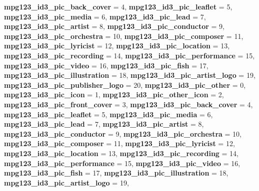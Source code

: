 \begin{DoxyCompactItemize}
\newline
{\bfseries mpg123\+\_\+id3\+\_\+pic\+\_\+back\+\_\+cover} = 4, 
{\bfseries mpg123\+\_\+id3\+\_\+pic\+\_\+leaflet} = 5, 
{\bfseries mpg123\+\_\+id3\+\_\+pic\+\_\+media} = 6, 
{\bfseries mpg123\+\_\+id3\+\_\+pic\+\_\+lead} = 7, 
\newline
{\bfseries mpg123\+\_\+id3\+\_\+pic\+\_\+artist} = 8, 
{\bfseries mpg123\+\_\+id3\+\_\+pic\+\_\+conductor} = 9, 
{\bfseries mpg123\+\_\+id3\+\_\+pic\+\_\+orchestra} = 10, 
{\bfseries mpg123\+\_\+id3\+\_\+pic\+\_\+composer} = 11, 
\newline
{\bfseries mpg123\+\_\+id3\+\_\+pic\+\_\+lyricist} = 12, 
{\bfseries mpg123\+\_\+id3\+\_\+pic\+\_\+location} = 13, 
{\bfseries mpg123\+\_\+id3\+\_\+pic\+\_\+recording} = 14, 
{\bfseries mpg123\+\_\+id3\+\_\+pic\+\_\+performance} = 15, 
\newline
{\bfseries mpg123\+\_\+id3\+\_\+pic\+\_\+video} = 16, 
{\bfseries mpg123\+\_\+id3\+\_\+pic\+\_\+fish} = 17, 
{\bfseries mpg123\+\_\+id3\+\_\+pic\+\_\+illustration} = 18, 
{\bfseries mpg123\+\_\+id3\+\_\+pic\+\_\+artist\+\_\+logo} = 19, 
\newline
{\bfseries mpg123\+\_\+id3\+\_\+pic\+\_\+publisher\+\_\+logo} = 20, 
{\bfseries mpg123\+\_\+id3\+\_\+pic\+\_\+other} = 0, 
{\bfseries mpg123\+\_\+id3\+\_\+pic\+\_\+icon} = 1, 
{\bfseries mpg123\+\_\+id3\+\_\+pic\+\_\+other\+\_\+icon} = 2, 
\newline
{\bfseries mpg123\+\_\+id3\+\_\+pic\+\_\+front\+\_\+cover} = 3, 
{\bfseries mpg123\+\_\+id3\+\_\+pic\+\_\+back\+\_\+cover} = 4, 
{\bfseries mpg123\+\_\+id3\+\_\+pic\+\_\+leaflet} = 5, 
{\bfseries mpg123\+\_\+id3\+\_\+pic\+\_\+media} = 6, 
\newline
{\bfseries mpg123\+\_\+id3\+\_\+pic\+\_\+lead} = 7, 
{\bfseries mpg123\+\_\+id3\+\_\+pic\+\_\+artist} = 8, 
{\bfseries mpg123\+\_\+id3\+\_\+pic\+\_\+conductor} = 9, 
{\bfseries mpg123\+\_\+id3\+\_\+pic\+\_\+orchestra} = 10, 
\newline
{\bfseries mpg123\+\_\+id3\+\_\+pic\+\_\+composer} = 11, 
{\bfseries mpg123\+\_\+id3\+\_\+pic\+\_\+lyricist} = 12, 
{\bfseries mpg123\+\_\+id3\+\_\+pic\+\_\+location} = 13, 
{\bfseries mpg123\+\_\+id3\+\_\+pic\+\_\+recording} = 14, 
\newline
{\bfseries mpg123\+\_\+id3\+\_\+pic\+\_\+performance} = 15, 
{\bfseries mpg123\+\_\+id3\+\_\+pic\+\_\+video} = 16, 
{\bfseries mpg123\+\_\+id3\+\_\+pic\+\_\+fish} = 17, 
{\bfseries mpg123\+\_\+id3\+\_\+pic\+\_\+illustration} = 18, 
\newline
{\bfseries mpg123\+\_\+id3\+\_\+pic\+\_\+artist\+\_\+logo} = 19, 

\end{DoxyCompactItemize}
